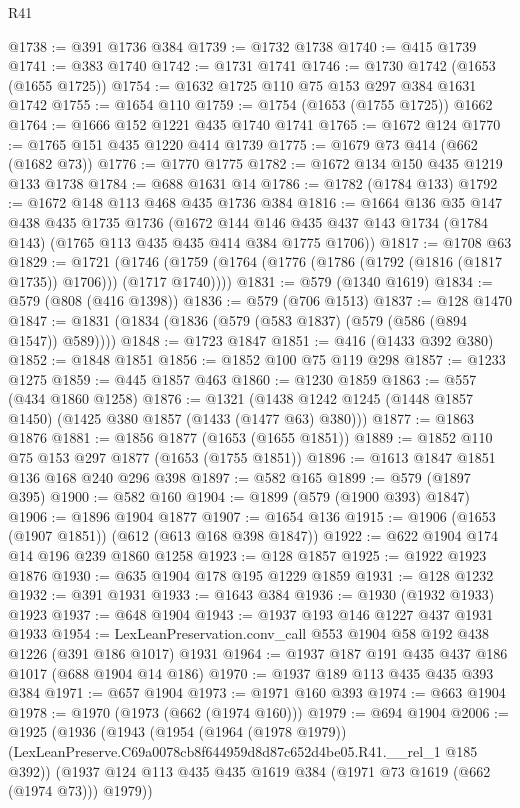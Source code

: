 \begin{lexlean}{R41}
\begin{coremodule}
@1738 := @391 @1736 @384
@1739 := @1732 @1738
@1740 := @415 @1739
@1741 := @383 @1740
@1742 := @1731 @1741
@1746 := @1730 @1742 (@1653 (@1655 @1725))
@1754 := @1632 @1725 @110 @75 @153 @297 @384 @1631 @1742
@1755 := @1654 @110
@1759 := @1754 (@1653 (@1755 @1725)) @1662
@1764 := @1666 @152 @1221 @435 @1740 @1741
@1765 := @1672 @124
@1770 := @1765 @151 @435 @1220 @414 @1739
@1775 := @1679 @73 @414 (@662 (@1682 @73))
@1776 := @1770 @1775
@1782 := @1672 @134 @150 @435 @1219 @133 @1738
@1784 := @688 @1631 @14
@1786 := @1782 (@1784 @133)
@1792 := @1672 @148 @113 @468 @435 @1736 @384
@1816 := @1664
    @136
    @35
    @147
    @438
    @435
    @1735
    @1736
    (@1672 @144 @146 @435 @437 @143 @1734 (@1784 @143) (@1765 @113 @435 @435 @414 @384 @1775 @1706))
@1817 := @1708 @63
@1829 := @1721
    (@1746 (@1759 (@1764 (@1776 (@1786 (@1792 (@1816 (@1817 @1735)) @1706))) (@1717 @1740))))
@1831 := @579 (@1340 @1619)
@1834 := @579 (@808 (@416 @1398))
@1836 := @579 (@706 @1513)
@1837 := @128 @1470
@1847 := @1831 (@1834 (@1836 (@579 (@583 @1837) (@579 (@586 (@894 @1547)) @589))))
@1848 := @1723 @1847
@1851 := @416 (@1433 @392 @380)
@1852 := @1848 @1851
@1856 := @1852 @100 @75 @119 @298
@1857 := @1233 @1275
@1859 := @445 @1857 @463
@1860 := @1230 @1859
@1863 := @557 (@434 @1860 @1258)
@1876 := @1321 (@1438 @1242 @1245 (@1448 @1857 @1450) (@1425 @380 @1857 (@1433 (@1477 @63) @380)))
@1877 := @1863 @1876
@1881 := @1856 @1877 (@1653 (@1655 @1851))
@1889 := @1852 @110 @75 @153 @297 @1877 (@1653 (@1755 @1851))
@1896 := @1613 @1847 @1851 @136 @168 @240 @296 @398
@1897 := @582 @165
@1899 := @579 (@1897 @395)
@1900 := @582 @160
@1904 := @1899 (@579 (@1900 @393) @1847)
@1906 := @1896 @1904 @1877
@1907 := @1654 @136
@1915 := @1906 (@1653 (@1907 @1851)) (@612 (@613 @168 @398 @1847))
@1922 := @622 @1904 @174 @14 @196 @239 @1860 @1258
@1923 := @128 @1857
@1925 := @1922 @1923 @1876
@1930 := @635 @1904 @178 @195 @1229 @1859
@1931 := @128 @1232
@1932 := @391 @1931
@1933 := @1643 @384
@1936 := @1930 (@1932 @1933) @1923
@1937 := @648 @1904
@1943 := @1937 @193 @146 @1227 @437 @1931 @1933
@1954 := LexLeanPreservation.conv_call @553 @1904 @58 @192 @438 @1226 (@391 @186 @1017) @1931
@1964 := @1937 @187 @191 @435 @437 @186 @1017 (@688 @1904 @14 @186)
@1970 := @1937 @189 @113 @435 @435 @393 @384
@1971 := @657 @1904
@1973 := @1971 @160 @393
@1974 := @663 @1904
@1978 := @1970 (@1973 (@662 (@1974 @160)))
@1979 := @694 @1904
@2006 := @1925
    (@1936
      (@1943
        (@1954
          (@1964 (@1978 @1979))
          (LexLeanPreserve.C69a0078cb8f644959d8d87c652d4be05.R41.__rel_1 @185 @392))
        (@1937 @124 @113 @435 @435 @1619 @384 (@1971 @73 @1619 (@662 (@1974 @73))) @1979))

\end{coremodule}
\end{lexlean}
